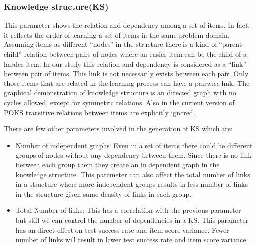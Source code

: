 \subsubsection{Knowledge structure(KS)}
This parameter shows the relation and dependency among a set of items. In fact, it reflects the order of learning a set of items in the same problem domain. Assuming items as different ``nodes'' in the structure there is a kind of ``parent-child'' relation between pairs of nodes where an easier item can be the child of a harder item. In our study this relation and dependency is considered as a ``link'' between pair of items. This link is not necessarily exists between each pair. Only those items that are related in the learning process can have a pairwise link. 
The graphical demonstration of knowledge structure is an directed graph with no cycles allowed, except for symmetric relations. Also in the current version of POKS transitive relations between items are explicitly ignored. %



There are few other parameters involved in the generation of KS which are:
\begin{itemize}
\item Number of independent graphs: Even in a set of items there could be different groups of nodes without any dependency between them. Since there is no link between each group them they create an in dependent graph in the knowledge structure. This parameter can also affect the total number of links in a structure where more independent groups results in less number of links in the structure given same density of links in each group. 
\item Total Number of links: This has a correlation with the previous parameter but still we can control the number of dependencies in a KS. This parameter has an direct effect on test success rate and item score variance. Fewer number of links will result in lower test success rate and item score variance.%
\end{itemize}


